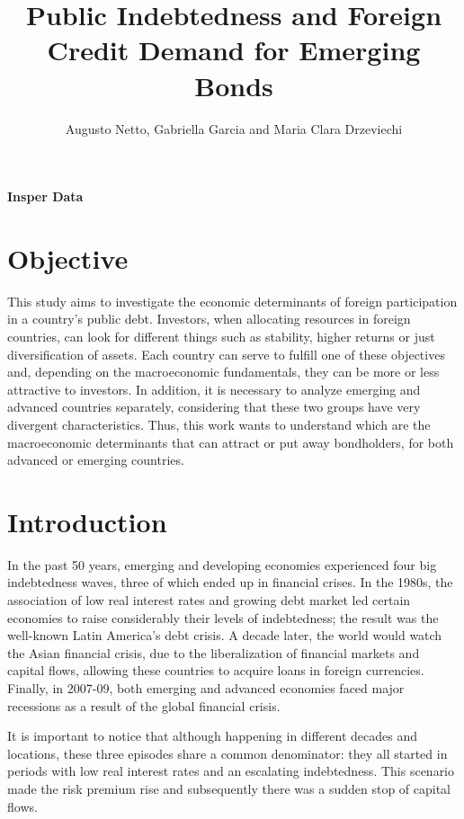 \documentclass[
]{article}
\title{Public Indebtedness and Foreign Credit Demand for Emerging Bonds}
\author{Augusto Netto, Gabriella Garcia and Maria Clara Drzeviechi}
\date{}
\begin{document}
\maketitle

{
\setcounter{tocdepth}{2}
\tableofcontents
}
\textbf{Insper Data}

\hypertarget{objective}{%
\section{Objective}\label{objective}}

This study aims to investigate the economic determinants of foreign
participation in a country's public debt. Investors, when allocating
resources in foreign countries, can look for different things such as
stability, higher returns or just diversification of assets. Each
country can serve to fulfill one of these objectives and, depending on
the macroeconomic fundamentals, they can be more or less attractive to
investors. In addition, it is necessary to analyze emerging and advanced
countries separately, considering that these two groups have very
divergent characteristics. Thus, this work wants to understand which are
the macroeconomic determinants that can attract or put away bondholders,
for both advanced or emerging countries.

\hypertarget{introduction}{%
\section{Introduction}\label{introduction}}

In the past 50 years, emerging and developing economies experienced four
big indebtedness waves, three of which ended up in financial crises. In
the 1980s, the association of low real interest rates and growing debt
market led certain economies to raise considerably their levels of
indebtedness; the result was the well-known Latin America's debt crisis.
A decade later, the world would watch the Asian financial crisis, due to
the liberalization of financial markets and capital flows, allowing
these countries to acquire loans in foreign currencies. Finally, in
2007-09, both emerging and advanced economies faced major recessions as
a result of the global financial crisis.

It is important to notice that although happening in different decades
and locations, these three episodes share a common denominator: they all
started in periods with low real interest rates and an escalating
indebtedness. This scenario made the risk premium rise and subsequently
there was a sudden stop of capital flows.
\end{document}
